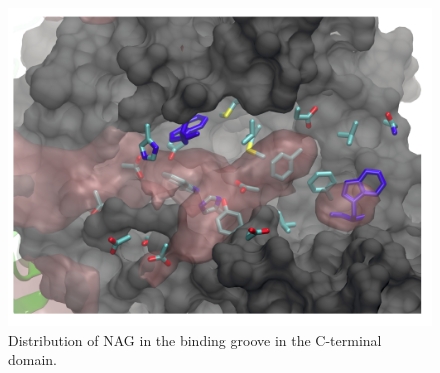 \begin{figure}[htbp]
\centering
\includegraphics[width=6.23in]{figures/results4/nag_cterminal_zoomedin.png}
\caption{Distribution of NAG in the binding groove in the C-terminal domain.}
\label{fig:nag_cterminal_zoomedin}
\end{figure}


\begin{singlespace}


\end{singlespace}




